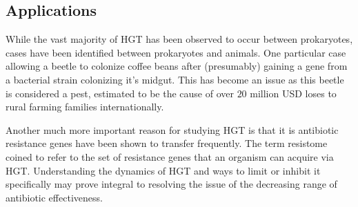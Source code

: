 \documentclass[12pt,letter]{article}
\begin{document}
\subsection{Applications}
While the vast majority of HGT has been observed to occur between prokaryotes, cases have been identified between prokaryotes and animals.
One particular case allowing a beetle to colonize coffee beans after (presumably) gaining a gene from a bacterial strain colonizing it's midgut\citep{beetle}.
This has become an issue as this beetle is considered a pest, estimated to be the cause of over $20$ million USD loses to rural farming families internationally\citep{beetle}.\par
Another much more important reason for studying HGT is that it is antibiotic resistance genes have been shown to transfer frequently\citep{amrhgt}.
The term resistome coined to refer to the set of resistance genes that an organism can acquire via HGT\citep{amrhgt}.
Understanding the dynamics of HGT and ways to limit or inhibit it specifically may prove integral to resolving the issue of the decreasing range of antibiotic effectiveness\citep{amrhgt}.
\end{document}
